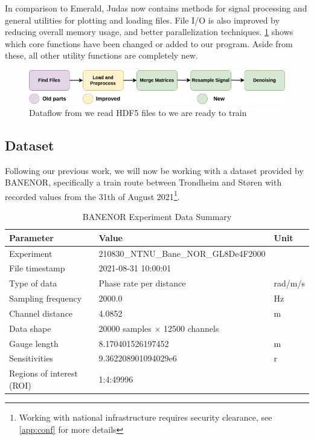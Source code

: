 In comparison to Emerald, Judas now contains methods for signal processing and general utilities for plotting and loading files. File I/O is also improved by reducing overall memory usage, and better parallelization techniques.
\ref{fig:apiflow} shows which core functions have been changed or added to our program. Aside from these, all other utility functions are completely new. \\

\begin{figure}[!h]
    \centering
    \includegraphics[scale=0.5]{figures/dataflow.png}
    \caption{Dataflow from we read HDF5 files to we are ready to train}
    \label{fig:apiflow}
\end{figure}

\subsection{Dataset}

Following our previous work, we will now be working with a dataset provided by BANENOR, specifically a train route between Trondheim and Støren with recorded values from the 31th of August 2021\footnote{Working with national infrastructure requires security clearance, see \ref{app:conf} for more details}. 

\begin{table}[!htbp]
    \centering
    \small
    \begin{tabular}{@{}p{}p{}p{}@{}}
        \toprule
        \textbf{Parameter} & \textbf{Value} & \textbf{Unit} \\
        \midrule
        Experiment & 210830\_NTNU\_Bane\_NOR\_GL8De4F2000 & \\
        File timestamp & 2021-08-31 10:00:01 & \\
        Type of data & Phase rate per distance & rad/m/s \\
        Sampling frequency & 2000.0 & \si{\hertz} \\
        Channel distance & 4.0852 & \si{\meter} \\
        \midrule
        Data shape & 20000 samples \(\times\) 12500 channels & \\
        \midrule
        Gauge length & 8.170401526197452 & \si{\meter} \\
        Sensitivities & 9.362208901094029e6 & r \\
        Regions of interest (ROI) & 1:4:49996 & \\
        \bottomrule
    \end{tabular}
    \caption{BANENOR Experiment Data Summary}
    \label{tab:experiment_data}
\end{table}


